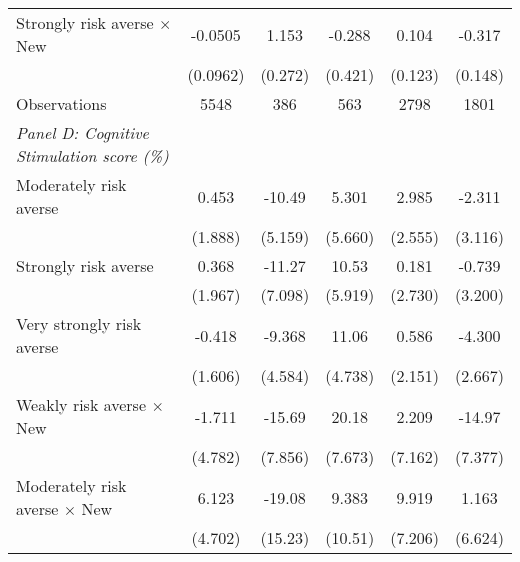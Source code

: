 {\begin{longtable}{l*{5}{c}}
Strongly risk averse $\times$ New&     -0.0505         &       1.153\sym{***}&      -0.288         &       0.104         &      -0.317\sym{**} \\
                    &    (0.0962)         &     (0.272)         &     (0.421)         &     (0.123)         &     (0.148)         \\
\midrule
Observations        &        5548         &         386         &         563         &        2798         &        1801         \\

\midrule
\textit{Panel D: Cognitive Stimulation score (\%)} & & & & & \\
Moderately risk averse&       0.453         &      -10.49\sym{**} &       5.301         &       2.985         &      -2.311         \\
                    &     (1.888)         &     (5.159)         &     (5.660)         &     (2.555)         &     (3.116)         \\

Strongly risk averse&       0.368         &      -11.27         &       10.53\sym{*}  &       0.181         &      -0.739         \\
                    &     (1.967)         &     (7.098)         &     (5.919)         &     (2.730)         &     (3.200)         \\

Very strongly risk averse&      -0.418         &      -9.368\sym{**} &       11.06\sym{**} &       0.586         &      -4.300         \\
                    &     (1.606)         &     (4.584)         &     (4.738)         &     (2.151)         &     (2.667)         \\

Weakly risk averse $\times$ New&      -1.711         &      -15.69\sym{**} &       20.18\sym{***}&       2.209         &      -14.97\sym{**} \\
                    &     (4.782)         &     (7.856)         &     (7.673)         &     (7.162)         &     (7.377)         \\

Moderately risk averse $\times$ New&       6.123         &      -19.08         &       9.383         &       9.919         &       1.163         \\
                    &     (4.702)         &     (15.23)         &     (10.51)         &     (7.206)         &     (6.624)         \\


\end{longtable}}
